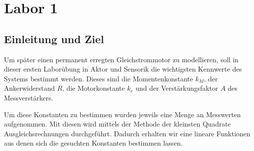 \section{Labor 1}

\subsection{Einleitung und Ziel}

Um später einen permanent erregten Gleichstrommotor zu modellieren, soll
in dieser ersten Laborübung in Aktor und Sensorik die wichtigsten
Kennwerte des Systems bestimmt werden. Dieses sind die Momentenkonstante
$k_M$, der Ankerwiderstand $R$, die Motorkonstante $k_e$ und der
Verstärkungsfaktor $A$ des Messverstärkers. 

Um diese Konstanten zu bestimmen wurden jeweils eine Menge an Messwerten
aufgenommen. Mit diesen wird mittels der Methode der kleinsten Quadrate 
Ausgleichsrechnungen durchgeführt. Dadurch erhalten wir eine lineare
Funktionen aus denen sich die gesuchten Konstanten bestimmen lassen.